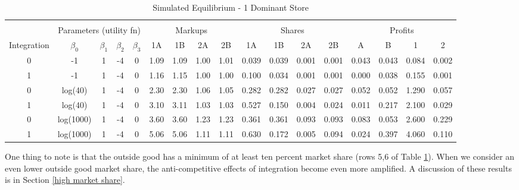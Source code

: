 \documentclass[12pt]{article}%
\begin{document}
\begin{table}[h]
{\begin{tabular}{c|cccc|cccc|cccc|cccc}
    \multicolumn{1}{c}{} &       &       &       & \multicolumn{1}{c}{} &       &       &       & \multicolumn{1}{c}{} &       &       &       & \multicolumn{1}{c}{} &       &       &       &  \\
          & \multicolumn{4}{c|}{Parameters (utility fn)} & \multicolumn{4}{c|}{Markups}  & \multicolumn{4}{c|}{Shares}   & \multicolumn{4}{c}{Profits} \\
    \midrule
    \multicolumn{1}{c|}{Integration} & \multicolumn{1}{c}{$\beta_0$} & \multicolumn{1}{c}{$\beta_1$} & \multicolumn{1}{c}{$\beta_2$} & \multicolumn{1}{c|}{$\beta_3$} & \multicolumn{1}{c}{1A} & \multicolumn{1}{c}{1B} & \multicolumn{1}{c}{2A} & \multicolumn{1}{c|}{2B} & \multicolumn{1}{c}{1A} & \multicolumn{1}{c}{1B} & \multicolumn{1}{c}{2A} & \multicolumn{1}{c|}{2B} & \multicolumn{1}{c}{A} & \multicolumn{1}{c}{B} & \multicolumn{1}{c}{1} & \multicolumn{1}{c}{2} \\
    \midrule
    \midrule
   0     & -1    & 1     & -4    & 0     & 1.09  & 1.09  & 1.00  & 1.01  & 0.039 & 0.039 & 0.001 & 0.001 & 0.043 & 0.043 & 0.084 & 0.002 \\
    1     & -1    & 1     & -4    & 0     & 1.16  & 1.15  & 1.00  & 1.00  & 0.100 & 0.034 & 0.001 & 0.001 & 0.000 & 0.038 & 0.155 & 0.001 \\
    0     & log(40) & 1     & -4    & 0     & 2.30  & 2.30  & 1.06  & 1.05  & 0.282 & 0.282 & 0.027 & 0.027 & 0.052 & 0.052 & 1.290 & 0.057 \\
    1     & log(40) & 1     & -4    & 0     & 3.10  & 3.11  & 1.03  & 1.03  & 0.527 & 0.150 & 0.004 & 0.024 & 0.011 & 0.217 & 2.100 & 0.029 \\
    0     & log(1000) & 1     & -4    & 0     & 3.60  & 3.60  & 1.23  & 1.23  & 0.361 & 0.361 & 0.093 & 0.093 & 0.083 & 0.053 & 2.600 & 0.229 \\
    1     & log(1000) & 1     & -4    & 0     & 5.06  & 5.06  & 1.11  & 1.11  & 0.630 & 0.172 & 0.005 & 0.094 & 0.024 & 0.397 & 4.060 & 0.110 \\

    \end{tabular}%
    }
    \caption{Simulated Equilibrium - 1 Dominant Store}
  \label{tab:store effects - 1 dom}%
\end{table}%

One thing to note is that the outside good has a minimum of at least ten percent market share (rows 5,6 of Table \ref{tab:store effects - 1 dom}). When we consider an even lower outside good market share, the anti-competitive effects of integration become even more amplified. A discussion of these results is in Section \ref{high market share}.
\end{document}
